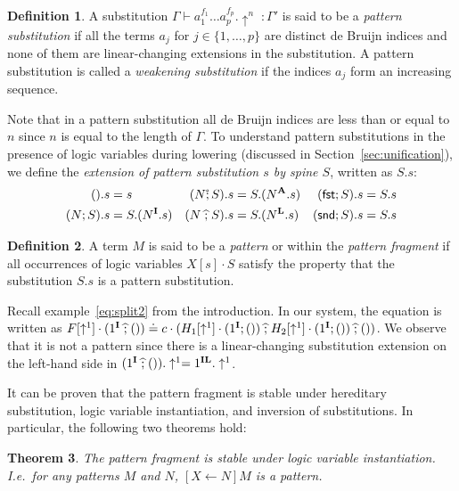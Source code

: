 \documentclass{eptcs}
\newcommand{\lhat}[1]{\widehat{\;#1\;}}
\newcommand\affext{\mathring{;}\,}
\newcommand\fI{\textup{$\mathbf{I}$}}
\newcommand\fA{\textup{$\mathbf{A}$}}
\newcommand\fL{\textup{$\mathbf{L}$}}
\newtheorem{thm}{Theorem}[section]
\theoremstyle{definition}
\newtheorem{defin}[thm]{Definition}
\begin{document}
\begin{defin} \label{def:patsub}
A substitution $\Gamma\vdash a_1^{f_1} \ldots a_p^{f_p}.\uparrow^n\;:\Gamma'$
is said to be a \emph{pattern substitution} if all the terms $a_j$ for
$j\in \{1,\ldots,p\}$ are distinct de Bruijn indices and none of them
are linear-changing extensions in the substitution.
A pattern substitution is called a \emph{weakening substitution} if the
indices $a_j$ form an increasing sequence.
\end{defin}

Note that in a pattern substitution all de Bruijn indices are less than or equal to $n$ since $n$ is
equal to the length of $\Gamma$.   To understand pattern
substitutions in the presence of logic variables during
lowering (discussed in Section~\ref{sec:unification}), we define the
\emph{extension of pattern substitution $s$ by spine $S$}, written as $S.s$:
\begin{align*}
().s &= s &              (N\affext S).s &= S.(N^\fA.s) & (\textsf{fst};S).s &= S.s \\
(N;S).s &= S.(N^\fI.s) & (N\lhat{;}S).s &= S.(N^\fL.s) & (\textsf{snd};S).s &= S.s
\end{align*}




\begin{defin}
A term $M$ is said to be a \emph{pattern} or within the
\emph{pattern fragment} if all
occurrences of logic variables $X[s]\cdot S$ satisfy the property that
the substitution $S.s$ is a pattern substitution.
\end{defin}

Recall example~\eqref{eq:split2} from the introduction.  In our system,
the equation is written as
$F[\uparrow^1]\cdot(1^{\fI}\lhat{;}())\doteq
c\cdot(H_1[\uparrow^1]\cdot(1^{\fI};())\lhat{;}H_2[\uparrow^1]\cdot(1^{\fI};())\lhat{;}())$.
We observe that it is not a pattern since there is a linear-changing substitution
extension on the left-hand side in $(1^{\fI}\lhat{;}()).\uparrow^1=1^{\fI\fL}.\uparrow^1$.

It can be proven that the pattern fragment is stable under hereditary
substitution, logic variable instantiation, and inversion of
substitutions.  In particular, the following two theorems hold:

\begin{thm}
The pattern fragment is stable under logic variable instantiation.
I.e.\ for any patterns $M$ and $N$, $[X\leftarrow N]M$ is a pattern.
\end{thm}
\end{document}
